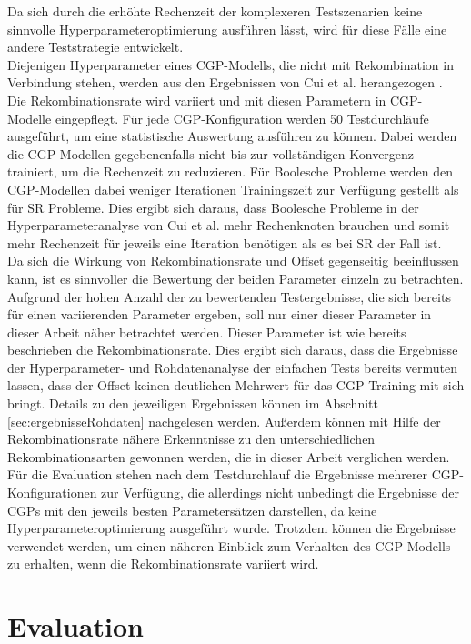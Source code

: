 Da sich durch die erhöhte Rechenzeit der komplexeren Testszenarien keine sinnvolle Hyperparameteroptimierung ausführen lässt, wird für diese Fälle eine andere Teststrategie entwickelt.\\
Diejenigen Hyperparameter eines CGP-Modells, die nicht mit Rekombination in Verbindung stehen, werden aus den Ergebnissen von Cui et al. herangezogen \cite{cui_results}.
Die Rekombinationsrate wird variiert und mit diesen Parametern in CGP-Modelle eingepflegt.
Für jede CGP-Konfiguration werden 50 Testdurchläufe ausgeführt, um eine statistische Auswertung ausführen zu können.
Dabei werden die CGP-Modellen gegebenenfalls nicht bis zur vollständigen Konvergenz trainiert, um die Rechenzeit zu reduzieren. 
Für Boolesche Probleme werden den CGP-Modellen dabei weniger Iterationen Trainingszeit zur Verfügung gestellt als für SR Probleme.
Dies ergibt sich daraus, dass Boolesche Probleme in der Hyperparameteranalyse von Cui et al. mehr Rechenknoten brauchen und somit mehr Rechenzeit für jeweils eine Iteration benötigen als es bei SR der Fall ist. \cite{cui_results}\\
Da sich die Wirkung von Rekombinationsrate und Offset gegenseitig beeinflussen kann, ist es sinnvoller die Bewertung der beiden Parameter einzeln zu betrachten.
Aufgrund der hohen Anzahl der zu bewertenden Testergebnisse, die sich bereits für einen variierenden Parameter ergeben, soll nur einer dieser Parameter in dieser Arbeit näher betrachtet werden.
Dieser Parameter ist wie bereits beschrieben die Rekombinationsrate.
Dies ergibt sich daraus, dass die Ergebnisse der Hyperparameter- und Rohdatenanalyse der einfachen Tests bereits vermuten lassen, dass der Offset keinen deutlichen Mehrwert für das CGP-Training mit sich bringt.
Details zu den jeweiligen Ergebnissen können im Abschnitt \ref{sec:ergebnisseRohdaten} nachgelesen werden.
Außerdem können mit Hilfe der Rekombinationsrate nähere Erkenntnisse zu den unterschiedlichen Rekombinationsarten gewonnen werden, die in dieser Arbeit verglichen werden.\\
Für die Evaluation stehen nach dem Testdurchlauf die Ergebnisse mehrerer CGP-Kon\-fi\-gu\-ra\-tio\-nen zur Verfügung, die allerdings nicht unbedingt die Ergebnisse der CGPs mit den jeweils besten Parametersätzen darstellen, da keine Hyperparameteroptimierung ausgeführt wurde.
Trotzdem können die Ergebnisse verwendet werden, um einen näheren Einblick zum Verhalten des CGP-Modells zu erhalten, wenn die Rekombinationsrate variiert wird.


\section{Evaluation}
\label{sec:Evaluation}

